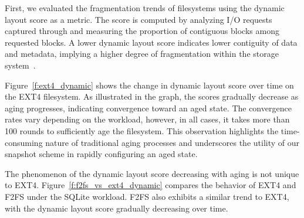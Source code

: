 First, we evaluated the fragmentation trends of filesystems using the dynamic layout score as a metric.
The score is computed by analyzing I/O requests captured through  and measuring the proportion of contiguous blocks among requested blocks.
A lower dynamic layout score indicates lower contiguity of data and metadata, implying a higher degree of fragmentation within the storage system~\cite{senescence:fast17}.

Figure~\ref{f:ext4_dynamic} shows the change in dynamic layout score over time on the EXT4 filesystem.
As illustrated in the graph, the scores gradually decrease as aging progresses, indicating convergence toward an aged state.
The convergence rates vary depending on the workload, however, in all cases, it takes more than 100 rounds to sufficiently age the filesystem.
This observation highlights the time-consuming nature of traditional aging processes and underscores the utility of our snapshot scheme in rapidly configuring an aged state.

The phenomenon of the dynamic layout score decreasing with aging is not unique to EXT4.
Figure~\ref{f:f2fs_vs_ext4_dynamic} compares the behavior of EXT4 and F2FS under the SQLite workload.
F2FS also exhibits a similar trend to EXT4, with the dynamic layout score gradually decreasing over time.


